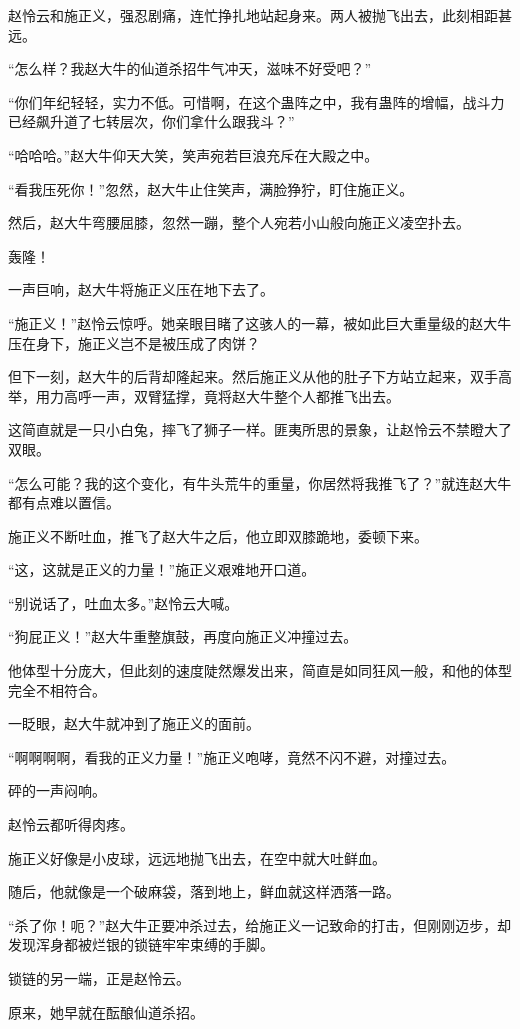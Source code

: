\begin{this_body}
赵怜云和施正义，强忍剧痛，连忙挣扎地站起身来。两人被抛飞出去，此刻相距甚远。

“怎么样？我赵大牛的仙道杀招牛气冲天，滋味不好受吧？”

“你们年纪轻轻，实力不低。可惜啊，在这个蛊阵之中，我有蛊阵的增幅，战斗力已经飙升道了七转层次，你们拿什么跟我斗？”

“哈哈哈。”赵大牛仰天大笑，笑声宛若巨浪充斥在大殿之中。

“看我压死你！”忽然，赵大牛止住笑声，满脸狰狞，盯住施正义。

然后，赵大牛弯腰屈膝，忽然一蹦，整个人宛若小山般向施正义凌空扑去。

轰隆！

一声巨响，赵大牛将施正义压在地下去了。

“施正义！”赵怜云惊呼。她亲眼目睹了这骇人的一幕，被如此巨大重量级的赵大牛压在身下，施正义岂不是被压成了肉饼？

但下一刻，赵大牛的后背却隆起来。然后施正义从他的肚子下方站立起来，双手高举，用力高呼一声，双臂猛撑，竟将赵大牛整个人都推飞出去。

这简直就是一只小白兔，摔飞了狮子一样。匪夷所思的景象，让赵怜云不禁瞪大了双眼。

“怎么可能？我的这个变化，有牛头荒牛的重量，你居然将我推飞了？”就连赵大牛都有点难以置信。

施正义不断吐血，推飞了赵大牛之后，他立即双膝跪地，委顿下来。

“这，这就是正义的力量！”施正义艰难地开口道。

“别说话了，吐血太多。”赵怜云大喊。

“狗屁正义！”赵大牛重整旗鼓，再度向施正义冲撞过去。

他体型十分庞大，但此刻的速度陡然爆发出来，简直是如同狂风一般，和他的体型完全不相符合。

一眨眼，赵大牛就冲到了施正义的面前。

“啊啊啊啊，看我的正义力量！”施正义咆哮，竟然不闪不避，对撞过去。

砰的一声闷响。

赵怜云都听得肉疼。

施正义好像是小皮球，远远地抛飞出去，在空中就大吐鲜血。

随后，他就像是一个破麻袋，落到地上，鲜血就这样洒落一路。

“杀了你！呃？”赵大牛正要冲杀过去，给施正义一记致命的打击，但刚刚迈步，却发现浑身都被烂银的锁链牢牢束缚的手脚。

锁链的另一端，正是赵怜云。

原来，她早就在酝酿仙道杀招。


\end{this_body}
